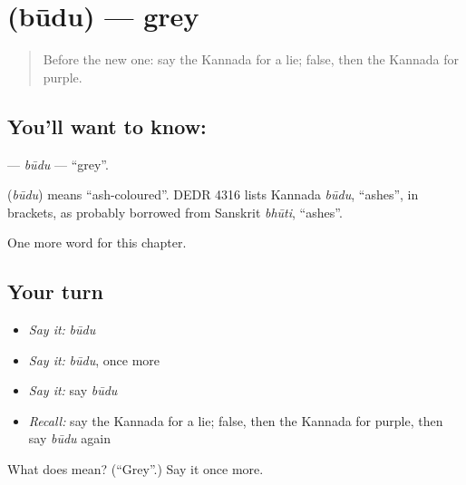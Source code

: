 \section[\texorpdfstring{\kn{ಬೂದು} (būdu)}{ಬೂದು (būdu)}]{ (būdu) — grey}

\label{lesson:KA-C144-budu}



\begin{quote}
Before the new one: say the Kannada for a lie; false, then the Kannada for purple.
\end{quote}

\subsection*{You'll want to know: }
\textbf{} — \emph{būdu} — \textquotedblleft{}grey\textquotedblright{}.

\begin{cousinweb}
\textbf{} (\emph{būdu}) means \textquotedblleft{}ash-coloured\textquotedblright{}. DEDR 4316 lists Kannada \emph{būdu}, \textquotedblleft{}ashes\textquotedblright{}, in brackets, as probably borrowed from Sanskrit \emph{bhūti}, \textquotedblleft{}ashes\textquotedblright{}.
\end{cousinweb}

\begin{grammarlens}[title={What you've built}]
One more word for this chapter.
\end{grammarlens}

\subsection*{Your turn}
\begin{itemize}
\raggedright
  \item \emph{Say it:} \emph{būdu}
  \item \emph{Say it:} \emph{būdu}, once more
  \item \emph{Say it:} say \emph{būdu}
  \item \emph{Recall:} say the Kannada for a lie; false, then the Kannada for purple, then say \emph{būdu} again
\end{itemize}

\begin{tcolorbox}[breakable,colback=teal!4,colframe=teal!35!black,title={Before you move on}]
What does  mean? (\textquotedblleft{}Grey\textquotedblright{}.) Say it once more.
\end{tcolorbox}
